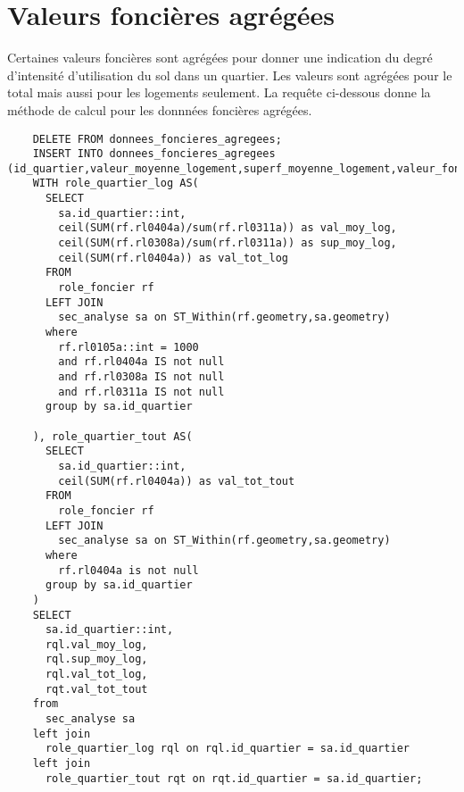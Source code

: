 \section{Valeurs foncières agrégées}\label{sec:annexe_val_fonc_agreg}
Certaines valeurs foncières sont agrégées pour donner une indication du degré d'intensité d'utilisation du sol dans un quartier. Les valeurs sont agrégées pour le total mais aussi pour les logements seulement. La requête ci-dessous donne la méthode de calcul pour les donnnées foncières agrégées.
\begin{lstlisting}
    DELETE FROM donnees_foncieres_agregees;
    INSERT INTO donnees_foncieres_agregees (id_quartier,valeur_moyenne_logement,superf_moyenne_logement,valeur_fonciere_logement_totale,valeur_fonciere_totale)
    WITH role_quartier_log AS(
      SELECT 
        sa.id_quartier::int,
        ceil(SUM(rf.rl0404a)/sum(rf.rl0311a)) as val_moy_log,
        ceil(SUM(rf.rl0308a)/sum(rf.rl0311a)) as sup_moy_log,
        ceil(SUM(rf.rl0404a)) as val_tot_log
      FROM
        role_foncier rf
      LEFT JOIN
        sec_analyse sa on ST_Within(rf.geometry,sa.geometry)
      where
        rf.rl0105a::int = 1000 
        and rf.rl0404a IS not null 
        and rf.rl0308a IS not null 
        and rf.rl0311a IS not null
      group by sa.id_quartier
      
    ), role_quartier_tout AS(
      SELECT 
        sa.id_quartier::int,
        ceil(SUM(rf.rl0404a)) as val_tot_tout
      FROM
        role_foncier rf
      LEFT JOIN
        sec_analyse sa on ST_Within(rf.geometry,sa.geometry)
      where
        rf.rl0404a is not null 
      group by sa.id_quartier
    )
    SELECT 
      sa.id_quartier::int,
      rql.val_moy_log,
      rql.sup_moy_log,
      rql.val_tot_log,
      rqt.val_tot_tout
    from
      sec_analyse sa
    left join 
      role_quartier_log rql on rql.id_quartier = sa.id_quartier
    left join
      role_quartier_tout rqt on rqt.id_quartier = sa.id_quartier;
\end{lstlisting}

